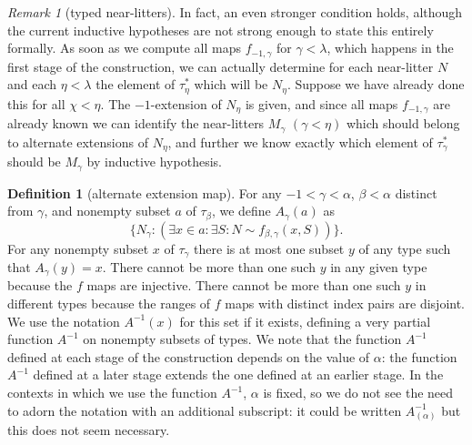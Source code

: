 \documentclass{article}
\newif\ifshowannotations
\newcommand{\annot}[1]{\ifshowannotations\marginpar{#1}\fi}
\theoremstyle{definition}
\newtheorem{definition}[theorem]{Definition}
\theoremstyle{remark}
\newtheorem{remark}[theorem]{Remark}
\begin{document}
{\begin{remark}[typed near-litters]
  In fact, an even stronger condition holds, although the current inductive hypotheses are not strong enough to state this entirely formally.  As soon as we compute all maps $f_{-1,\gamma}$ for $\gamma<\lambda$, which happens in the first stage of the construction, we can actually determine for each near-litter $N$ and each $\eta<\lambda$ the element of $\tau^*_{\eta}$ which will be $N_\eta$.
  Suppose we have already done this for all $\chi<\eta$.  The $-1$-extension of $N_\eta$ is given,
  and since all maps $f_{-1,\gamma}$ are already known we can identify the near-litters $M_\gamma$ $(\gamma<\eta)$ which should belong to alternate extensions of $N_\eta$, and further we know exactly which element of $\tau^*_\gamma$ should be $M_\gamma$ by inductive hypothesis.
\end{remark}

\begin{definition}[alternate extension map]\label{def:a_map}
For any $-1 < \gamma < \alpha$, $\beta<\alpha$ distinct from $\gamma$, and nonempty subset $a$ of $\tau_\beta$, we define $A_\gamma(a)$ as
$$\{N_\gamma:(\exists x \in a:\exists S:N \sim f_{\beta,\gamma}(x,S))\}.$$
For any nonempty subset $x$ of $\tau_\gamma$ there is at most one subset $y$ of any type such that $A_\gamma(y)=x$.  There cannot be more than one such $y$ in any given type because the $f$ maps are injective.  There cannot be more than one such $y$ in different types because the ranges of $f$ maps with distinct index pairs are disjoint.   We use the notation $A^{-1}(x)$ for this set if it exists, defining a very partial function $A^{-1}$ on nonempty subsets of types.  We note that the function $A^{-1}$ defined at each stage of the construction depends on the value of $\alpha$:  the function $A^{-1}$ defined at a later stage extends the one defined at an earlier stage.  In the contexts in which we use the function $A^{-1}$, $\alpha$ is fixed, so we do not see the need to adorn the notation with an additional subscript:  it could be written $A^{-1}_{(\alpha)}$ but this does not seem necessary. \annot{\tiny It is useful to note, re a comment of the referee, that the properties ``pre-extensional'' and ``extensional'' do not appear in the recursive hypotheses, and nor does $A^{-1}$:  its definition and use appears entirely encapsulated in one step of the recursion.  The appearance of ``extensional'' in the hypotheses has to do precisely with satisfaction of the extensionality axiom of TTT.  We did add a remark that the $A^{-1}$ at each stage does depend on $\alpha$.}
\end{definition}

}
\end{document}
